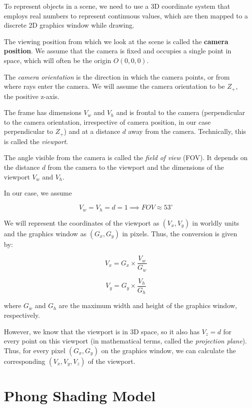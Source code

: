 \documentclass[conference]{IEEEtran}
\begin{document}
To represent objects in a scene, we need to use a 3D coordinate system that employs real numbers to represent continuous values, which are then mapped to a discrete 2D graphics window while drawing.

The viewing position from which we look at the scene is called the \textbf{camera position}. We assume that the camera is fixed and occupies a single point in space, which will often be the origin $O(0,0,0)$.

The \textit{camera orientation}\cite{peter} is the direction in which the camera points, or from where rays enter the camera. We will assume the camera orientation to be $Z_+$, the positive z-axis.

The frame has dimensions $V_w$ and $V_h$ and is frontal to the camera (perpendicular to the camera orientation, irrespective of camera position, in our case perpendicular to $Z_+$) and at a distance $d$ away from the camera. Technically, this is called the \textit{viewport}\cite{peter}.

The angle visible from the camera is called the \textit{field of view} (FOV).\cite{peter} It depends on the distance $d$ from the camera to the viewport and the dimensions of the viewport $V_w$ and $V_h$.

In our case, we assume 

$$V_w = V_h = d = 1 \implies FOV \approx 53^\circ$$

We will represent the coordinates of the viewport as $(V_x,V_y)$ in worldly units and the graphics window as $(G_x,G_y)$ in pixels. Thus, the conversion is given by:

$$V_x = G_x \times \frac{V_w}{G_w}$$

$$V_y = G_y \times \frac{V_h}{G_h}$$

where $G_w$ and $G_h$ are the maximum width and height of the graphics window, respectively.

However, we know that the viewport is in 3D space, so it also has $V_z = d$ for every point on this viewport (in mathematical terms, called the \textit{projection plane}). \\
Thus, for every pixel $(G_x, G_y)$ on the graphics window, we can calculate the corresponding $(V_x, V_y, V_z)$ of the viewport.

\section{Phong Shading Model}
\end{document}
